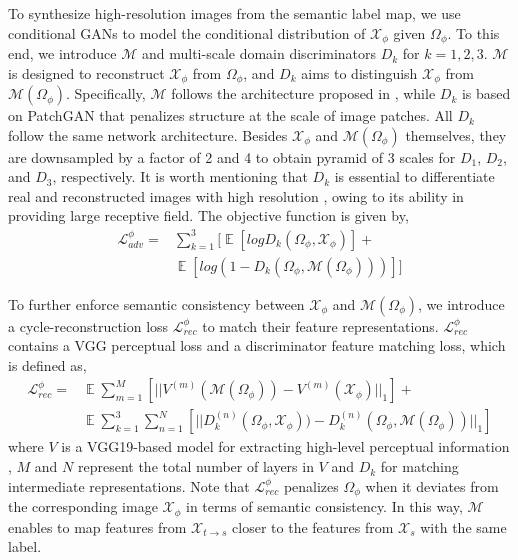 \documentclass[runningheads]{llncs}
\begin{document}
	To synthesize high-resolution images from the semantic label map, we use conditional GANs \cite{isola2017image} to model the conditional distribution of $ \mathcal{X}_{\phi} $ given $ \Omega_{\phi} $. To this end, we introduce $ \mathcal{M} $ and multi-scale domain discriminators $ D_{k} $ for $ k = 1,2,3 $. $ \mathcal{M} $ is designed to reconstruct $ \mathcal{X}_{\phi} $ from $ \Omega_{\phi} $, and $ D_{k} $ aims to distinguish $ \mathcal{X}_{\phi} $ from $ \mathcal{M}(\Omega_{\phi}) $. Specifically, $ \mathcal{M} $ follows the architecture proposed in \cite{johnson2016perceptual}, while $ D_{k} $ is based on PatchGAN \cite{isola2017image} that penalizes structure at the scale of image patches. All $ D_{k} $ follow the same network architecture. Besides $ \mathcal{X}_{\phi} $ and $ \mathcal{M}(\Omega_{\phi}) $ themselves, they are downsampled by a factor of 2 and 4 to obtain pyramid of 3 scales for $ D_{1} $, $ D_{2} $, and $ D_{3} $, respectively. It is worth mentioning that $ D_{k} $ is essential to differentiate real and reconstructed images with high resolution \cite{wang2017high}, owing to its ability in providing large receptive field. The objective function is given by,
	\begin{equation}
	\begin{aligned}
	{\mathcal{L}_{adv}^{\phi}} = {} &
	\sum\nolimits_{k=1}^{3}[\mathop{\mathbb{E}}[log{D_k(\Omega_{\phi}, \mathcal{X}_{\phi})}] + \\ & \mathop{\mathbb{E}}[log{(1 - D_k(\Omega_{\phi}, \mathcal{M}(\Omega_{\phi})))}]]
	\end{aligned}
	\end{equation}
	
	To further enforce semantic consistency between $ \mathcal{X}_{\phi} $ and $ \mathcal{M}(\Omega_{\phi}) $, we introduce a cycle-reconstruction loss $ \mathcal{L}_{rec}^{\phi} $ to match their feature representations. $ \mathcal{L}_{rec}^{\phi} $ contains a VGG perceptual loss and a discriminator feature matching loss, which is defined as,
	\begin{equation} \label{eq:recons}
	\begin{aligned}
	\mathcal{L}_{rec}^{\phi} = {} &
	\mathop{\mathbb{E}}\sum_{m=1}^{M}[||V^{(m)}(\mathcal{M}(\Omega_{\phi})) - V^{(m)}(\mathcal{X}_{\phi})||_1] + \\ &
	\mathop{\mathbb{E}}\sum_{k=1}^{3}\sum_{n=1}^{N}[||D^{(n)}_k(\Omega_{\phi}, \mathcal{X}_{\phi})) - D^{(n)}_k(\Omega_{\phi}, \mathcal{M}(\Omega_{\phi}))||_1]
	\end{aligned}
	\end{equation} 
	where $ V $ is a VGG19-based model for extracting high-level perceptual information \cite{johnson2016perceptual}, $ M $ and $ N $ represent the total number of layers in $ V $ and $ D_{k} $ for matching intermediate representations. Note that $ \mathcal{L}_{rec}^{\phi} $ penalizes $ \Omega_{\phi} $ when it deviates from the corresponding image $ \mathcal{X}_{\phi} $ in terms of semantic consistency. In this way, $ \mathcal{M} $ enables to map features from $ \mathcal{X}_{t{\rightarrow}s} $ closer to the features from $ \mathcal{X}_s $ with the same label. 
	
\end{document}
